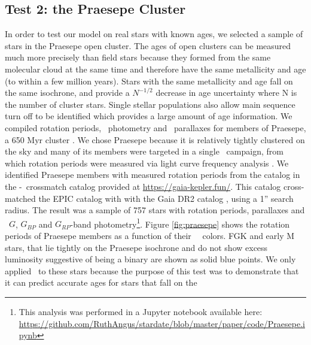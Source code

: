 \subsection{Test 2: the Praesepe Cluster}
In order to test our model on real stars with known ages, we selected a sample
of stars in the Praesepe open cluster.
The ages of open clusters can be measured much more precisely than field stars
because they formed from the same molecular cloud at the same time and
therefore have the same metallicity and age (to within a few million years).
Stars with the same metallicity and age fall on the same isochrone, and
provide a $N^{-1/2}$ decrease in age uncertainty where N is the number of
cluster stars.
Single stellar populations also allow main sequence turn off to be identified
which provides a large amount of age information.
We compiled rotation periods, \Gaia\ photometry and \gaia\ parallaxes for
members of Praesepe, a 650 Myr cluster \citep{fossati2008}.
We chose Praesepe because it is relatively tightly clustered on the sky and
many of its members were targeted in a single \ktwo\ campaign, from which
rotation periods were measured via light curve frequency analysis
\citep{douglas2017, rebull2017}.
We identified Praesepe members with measured rotation periods from the
\citet{douglas2017} catalog in the \ktwo-\gaia\ crossmatch catalog provided at
\url{https://gaia-kepler.fun/}.
This catalog cross-matched the EPIC catalog \citep{huber2016} with with the
Gaia DR2 catalog \citep{brown2018}, using a 1'' search radius.
The result was a sample of 757 stars with rotation periods, parallaxes and
\gaia\ $G$, $G_{BP}$ and $G_{RP}$-band photometry\footnote{This analysis was
performed in a Jupyter notebook available here:
\url{
https://github.com/RuthAngus/stardate/blob/master/paper/code/Praesepe.ipynb}}.
Figure \ref{fig:praesepe} shows the rotation periods of Praesepe members as
a function of their \gaia\ \gcolor\ colors.
FGK and early M stars, that lie tightly on the Praesepe isochrone and do not
show excess luminosity suggestive of being a binary are shown as solid blue
points.
We only applied \sd\ to these stars because the purpose of this test was to
demonstrate that it can predict accurate ages for stars that fall on the
